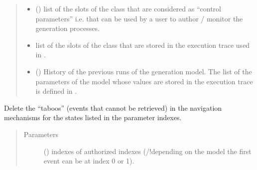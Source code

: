 \documentclass[letterpaper,10pt,english]{sphinxmanual}
\begin{document}
\begin{fulllineitems}
\begin{quote}
\begin{description}
\begin{itemize}
\item {} 
 (\sphinxstyleliteralemphasis{(}\sphinxstyleliteralemphasis{)}) \textendash{} list of the slots of the class that are considered as “control parameters” i.e. that can be used by a user to author / monitor the generation processes.

\item {} 
 \textendash{} list of the slots of the class that are stored in the execution trace used in .

\item {} 
 () \textendash{} History of the previous runs of the generation model. The list of the parameters of the model whose values are stored in the execution trace is defined in .

\end{itemize}

\end{description}\end{quote}

\begin{fulllineitems}
\label{\detokenize{index:Navigator.Navigator.authorize_indexes}}
Delete the “taboos” (events that cannot be retrieved) in the navigation mechanisms for the states listed in the parameter indexes.
\begin{quote}\begin{description}
\item[{Parameters}] \leavevmode
{} (\sphinxstyleliteralemphasis{(}\sphinxstyleliteralemphasis{)}) \textendash{} indexes of authorized indexes (/!depending on the model the first event can be at index 0 or 1).

\end{description}\end{quote}


\end{fulllineitems}
\end{fulllineitems}
\end{document}
